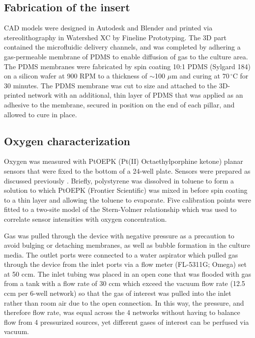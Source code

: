 \documentclass[10pt,letterpaper]{article}
\begin{document}
\subsection*{Fabrication of the insert}

CAD models were designed in Autodesk and Blender and printed via stereolithography in Watershed XC by Fineline Prototyping.
The 3D part contained the microfluidic delivery channels, and was completed by adhering a gas-permeable membrane of PDMS to enable diffusion of gas to the culture area. 
The PDMS membranes were fabricated by spin coating 10:1 PDMS (Sylgard 184) on a silicon wafer at 900 RPM to a thickness of $\sim$100 $\mu$m and curing at $70\,^{\circ}$C for 30 minutes.
The PDMS membrane was cut to size and attached to the 3D-printed network with an additional, thin layer of PDMS that was applied as an adhesive to the membrane, secured in position on the end of each pillar, and allowed to cure in place.

\subsection*{Oxygen characterization}

Oxygen was measured with PtOEPK (Pt(II) Octaethylporphine ketone) planar sensors that were fixed to the bottom of a 24-well plate.
Sensors were prepared as discussed previously \cite{Sinkala2010,Rexius-Hall2014}. 
Briefly, polystyrene was dissolved in toluene to form a solution to which PtOEPK (Frontier Scientific) was mixed in before spin coating to a thin layer and allowing the toluene to evaporate.
Five calibration points were fitted to a two-site model\cite{Carraway1991,Wang2014} of the Stern-Volmer relationship which was used to correlate sensor intensities with oxygen concentration.

Gas was pulled through the device with negative pressure as a precaution to avoid bulging or detaching membranes, as well as bubble formation in the culture media.
The outlet ports were connected to a water aspirator which pulled gas through the device from the inlet ports via a flow meter (FL-5311G; Omega) set at 50 ccm.
The inlet tubing was placed in an open cone that was flooded with gas from a tank with a flow rate of 30 ccm which exceed the vacuum flow rate (12.5 ccm per 6-well network) so that the gas of interest was pulled into the inlet rather than room air due to the open connection.
In this way, the pressure, and therefore flow rate, was equal across the 4 networks without having to balance flow from 4 pressurized sources, yet different gases of interest can be perfused via vacuum.
\end{document}
